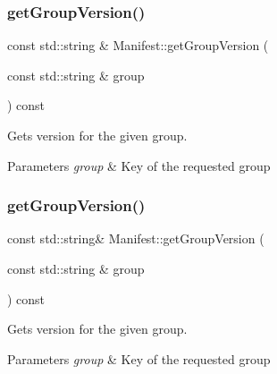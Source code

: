 \subsubsection{\texorpdfstring{get\+Group\+Version()}{getGroupVersion()}\hspace{0.1cm}{\footnotesize\ttfamily [1/2]}}
{\footnotesize\ttfamily const std\+::string \& Manifest\+::get\+Group\+Version (\begin{DoxyParamCaption}\item[{const std\+::string \&}]{group }\end{DoxyParamCaption}) const\hspace{0.3cm}{\ttfamily [protected]}}



Gets version for the given group. 


\begin{DoxyParams}{Parameters}
{\em group} & Key of the requested group \\
\hline
\end{DoxyParams}
\mbox{\label{classManifest_a6c16730def8fc54b923db36c60af38d7}} 
\subsubsection{\texorpdfstring{get\+Group\+Version()}{getGroupVersion()}\hspace{0.1cm}{\footnotesize\ttfamily [2/2]}}
{\footnotesize\ttfamily const std\+::string\& Manifest\+::get\+Group\+Version (\begin{DoxyParamCaption}\item[{const std\+::string \&}]{group }\end{DoxyParamCaption}) const\hspace{0.3cm}{\ttfamily [protected]}}



Gets version for the given group. 


\begin{DoxyParams}{Parameters}
{\em group} & Key of the requested group \\
\hline
\end{DoxyParams}
\mbox{\label{classManifest_a47aa1ad3edc161e420109489ce36823f}} 
